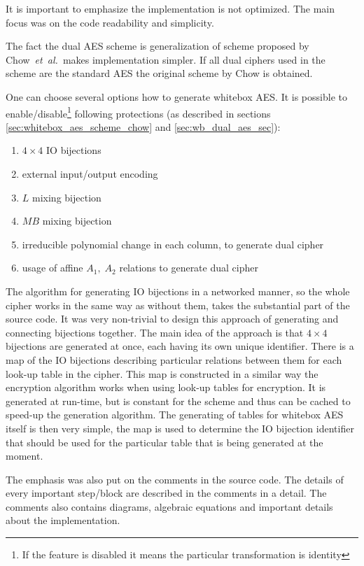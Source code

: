 \documentclass[11pt,oneside,final]{fithesis2}
\newcommand{\eal}{\emph{et~al.}}
\begin{document}
    It is important to emphasize the implementation is not optimized. The main focus was on the code readability and simplicity.
    
    The fact the dual AES scheme is generalization of scheme proposed by Chow~\eal~makes implementation simpler. If all dual ciphers used in the scheme are the 
    standard AES the original scheme by Chow is obtained. 
    
    One can choose several options how to generate whitebox AES. It is possible to 
    enable/disable\footnote{If the feature is disabled it means the particular transformation is identity} following protections 
    (as described in sections \ref{sec:whitebox_aes_scheme_chow} and \ref{sec:wb_dual_aes_sec}):
    \begin{enumerate}
     \item $4\times4$ IO bijections
     \item external input/output encoding
     \item $L$ mixing bijection
     \item $MB$ mixing bijection
     \item irreducible polynomial change in each column, to generate dual cipher
     \item usage of affine $A_1,\;A_2$ relations to generate dual cipher
    \end{enumerate}
    
    The algorithm for generating IO bijections in a networked manner, so the whole cipher works
    in the same way as without them, takes the substantial part of the source code. It was very non-trivial to design this approach 
    of generating and connecting bijections together. The main idea of the approach
    is that $4\times4$ bijections are generated at once, each having its own unique identifier. 
    There is a map of the IO bijections describing particular relations between them for each look-up table in the cipher. This map is constructed in a 
    similar way the encryption algorithm works when using look-up tables for encryption. It is generated at run-time, but is constant for the scheme
    and thus can be cached to speed-up the generation algorithm. The generating of tables for whitebox AES itself is then very simple, the map is used to determine 
    the IO bijection identifier that should be used for the particular table that is being generated at the moment.
    
    The emphasis was also put on the comments in the source code. The details of every important step/block are described 
    in the comments in a detail. The comments also contains diagrams, algebraic equations and important details about the implementation.
\end{document}
